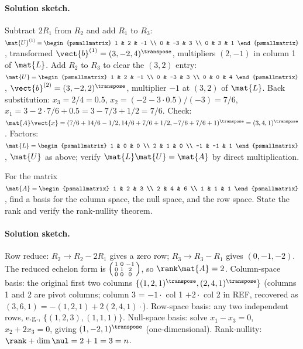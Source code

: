 \paragraph{Solution sketch.}
Subtract $2 R_{1}$ from $R_{2}$ and add $R_{1}$ to $R_{3}$:
$\mat{U}^{(1)} = \begin{psmallmatrix} 1 & 2 & -1 \\ 0 & -3 & 3 \\
0 & 3 & 1 \end{psmallmatrix}$, transformed $\vect{b}^{(1)} = (3,
-2, 4)^{\transpose}$, multipliers $(2, -1)$ in column 1 of $\mat{L}$.
Add $R_{2}$ to $R_{3}$ to clear the $(3,2)$ entry: $\mat{U} =
\begin{psmallmatrix} 1 & 2 & -1 \\ 0 & -3 & 3 \\ 0 & 0 & 4
\end{psmallmatrix}$, $\vect{b}^{(2)} = (3, -2, 2)^{\transpose}$,
multiplier $-1$ at $(3,2)$ of $\mat{L}$. Back substitution:
$x_{3} = 2/4 = 0.5$, $x_{2} = (-2 - 3 \cdot 0.5)/(-3) = 7/6$,
$x_{1} = 3 - 2 \cdot 7/6 + 0.5 = 3 - 7/3 + 1/2 = 7/6$. Check:
$\mat{A}\vect{x} = (7/6 + 14/6 - 1/2, 14/6 + 7/6 + 1/2, -7/6 +
7/6 + 1)^{\transpose} = (3, 4, 1)^{\transpose}$. Factors: $\mat{L}
= \begin{psmallmatrix} 1 & 0 & 0 \\ 2 & 1 & 0 \\ -1 & -1 & 1
\end{psmallmatrix}$, $\mat{U}$ as above; verify $\mat{L}\mat{U} =
\mat{A}$ by direct multiplication.

\begin{exercise}
For the matrix $\mat{A} = \begin{psmallmatrix} 1 & 2 & 3 \\ 2 & 4
& 6 \\ 1 & 1 & 1 \end{psmallmatrix}$, find a basis for the column
space, the null space, and the row space. State the rank and
verify the rank-nullity theorem.
\end{exercise}

\paragraph{Solution sketch.}
Row reduce: $R_{2} \to R_{2} - 2 R_{1}$ gives a zero row;
$R_{3} \to R_{3} - R_{1}$ gives $(0, -1, -2)$. The reduced echelon
form is $\begin{psmallmatrix} 1 & 0 & -1 \\ 0 & 1 & 2 \\ 0 & 0 & 0
\end{psmallmatrix}$, so $\rank \mat{A} = 2$. Column-space basis:
the original first two columns $\{(1, 2, 1)^{\transpose}, (2, 4,
1)^{\transpose}\}$ (columns 1 and 2 are pivot columns; column 3 =
$-1 \cdot$ col 1 $+ 2 \cdot$ col 2 in REF, recovered as $(3, 6, 1)
= -(1,2,1) + 2(2,4,1) \cdot$). Row-space basis: any two
independent rows, e.g., $\{(1, 2, 3), (1, 1, 1)\}$. Null-space
basis: solve $x_{1} - x_{3} = 0$, $x_{2} + 2 x_{3} = 0$, giving
$(1, -2, 1)^{\transpose}$ (one-dimensional). Rank-nullity: $\rank
+ \dim \nul = 2 + 1 = 3 = n$.

